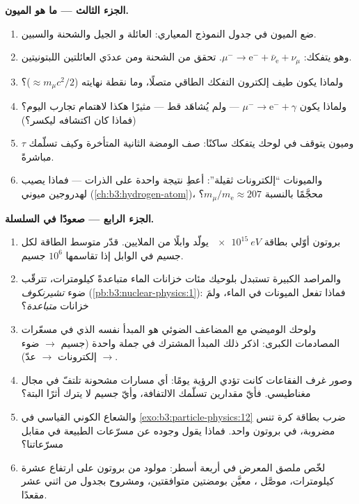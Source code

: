 \begin{problem}
\medskip\noindent\textbf{الجزء الثالث --- ما هو الميون.}

\begin{enumerate}[resume]
  \item ضع الميون في جدول النموذج المعياري: العائلة و
        الجيل والشحنة والسبين.
  \item وهو يتفكك: $\mu^- \to \text{e}^- + \bar\nu_{\text{e}} +
        \nu_\mu$. تحقق من الشحنة ومن عددَي العائلتين اللبتونيتين.
  \item ولماذا يكون طيف إلكترون التفكك الطاقي متصلًا،
        وما نقطة نهايته ($\approx m_\mu c^2/2$)؟
  \item ولماذا يكون $\mu^- \to \text{e}^- + \gamma$ --- ولم
        يُشاهَد قط --- مثيرًا هكذا لاهتمام تجارب اليوم؟
        (فماذا كان اكتشافه ليكسر؟)
  \item وميون يتوقف في لوحك يتفكك ساكنًا: صف
        الومضة الثانية المتأخرة وكيف تسلّمك $\tau$
        مباشرةً.
  \item والميونات ``إلكترونات ثقيلة'': أعطِ نتيجة واحدة
        على الذرات --- فماذا يصيب  لهدروجين
        ميوني (\cref{ch:b3:hydrogen-atom})، محجَّمًا بالنسبة
        $m_\mu/m_{\text{e}} \approx 207$؟
\end{enumerate}

\medskip\noindent\textbf{الجزء الرابع --- صعودًا في السلسلة.}

\begin{enumerate}[resume]
  \item بروتون أوّلي بطاقة $\qty{e15}{eV}$ يولّد وابلًا من
        الملايين. قدّر متوسط الطاقة لكل جسيم في الوابل
        إذا تقاسمها $10^{6}$ جسيم.
  \item والمراصد الكبيرة تستبدل بلوحيك مئات
        خزانات الماء متباعدةً كيلومترات، تترقّب
        ضوء \emph{تشيرنكوف} (\cref{pb:b3:nuclear-physics:1}):
        فماذا تفعل الميونات في الماء، ولمَ خزانات
        \emph{متباعدة}؟
  \item ولوحك الوميضي مع المضاعف الضوئي هو المبدأ
        نفسه الذي في مسعّرات المصادمات الكبرى:
        اذكر ذلك المبدأ المشترك في جملة واحدة
        (جسيم $\to$ ضوء $\to$ إلكترونات $\to$ عدّ).
  \item وصور غرف الفقاعات كانت تؤدي الرؤية يومًا: أي مسارات
        مشحونة تلتفّ في مجال مغناطيسي. فأيّ مقدارين
        تسلّمك الالتفافة، وأيّ جسيم لا يترك أثرًا البتة؟
  \item والشعاع الكوني القياسي في
        \cref{exo:b3:particle-physics:12} ضرب بطاقة
        كرة تنس مضروبة، في بروتون واحد. فماذا يقول
        وجوده عن مسرّعات الطبيعة في مقابل مسرّعاتنا؟
  \item لخّص ملصق المعرض في أربعة أسطر: مولود من
        بروتون على ارتفاع عشرة كيلومترات، موصَّل ،
        معيَّن بومضتين متوافقتين، ومشروح
        بجدول من اثني عشر مقعدًا.
\end{enumerate}
\end{problem}
